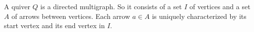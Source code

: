 \documentclass[12pt]{article}
\begin{document}
A quiver $Q$ is a directed multigraph. So it consists of a set $I$ of vertices and a set $A$ of arrows between vertices. Each arrow $a\in A$ is uniquely characterized by its start vertex and its end vertex in $I$.
\end{document}

